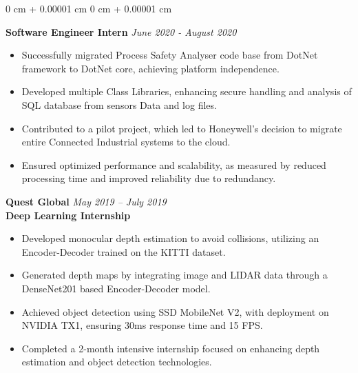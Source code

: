 \documentclass[10pt, letterpaper]{article}
\newenvironment{highlights}{
    \begin{itemize}[
        topsep=0.03 cm,
        parsep=0.02 cm,
        partopsep=0pt,
        itemsep=0pt,
        leftmargin=0 cm + 5pt
    ]
}{
    \end{itemize}
} %
\newenvironment{onecolentry}{
    \begin{adjustwidth}{
        0 cm + 0.00001 cm
    }{
        0 cm + 0.00001 cm
    }
}{
    \end{adjustwidth}
} %
\begin{document}
\begin{onecolentry}
            \vspace{0.2 cm}
            \textbf{\normalsize Software Engineer Intern} \hfill \textit{June 2020 -  August 2020} \\[0.2cm] %
            \begin{adjustwidth}{0.4cm}{0cm}
                \begin{highlights}
                    \item Successfully migrated Process Safety Analyser code base from DotNet framework to DotNet core, achieving platform independence.
                    \item Developed multiple Class Libraries, enhancing secure handling and analysis of SQL database from sensors Data and log files.
                    \item Contributed to a pilot project, which led to Honeywell's decision to migrate entire Connected Industrial systems to the cloud.
                    \item Ensured optimized performance and scalability, as measured by reduced processing time and improved reliability due to redundancy.
                \end{highlights}
            \end{adjustwidth}

            \vspace{0.2 cm}
            \textbf{\large  Quest Global} \hfill \textit{May 2019 – July 2019} \\  
            \textbf{Deep Learning Internship} \\  
            \begin{adjustwidth}{0.4cm}{0cm}
                \begin{highlights}
                    \item Developed monocular depth estimation to avoid collisions, utilizing an Encoder-Decoder trained on the KITTI dataset.
                    \item Generated depth maps by integrating image and LIDAR data through a DenseNet201 based Encoder-Decoder model.
                    \item Achieved object detection using SSD MobileNet V2, with deployment on NVIDIA TX1, ensuring 30ms response time and 15 FPS.
                    \item Completed a 2-month intensive internship focused on enhancing depth estimation and object detection technologies.
                \end{highlights}
            \end{adjustwidth}


\end{onecolentry}
\end{document}
